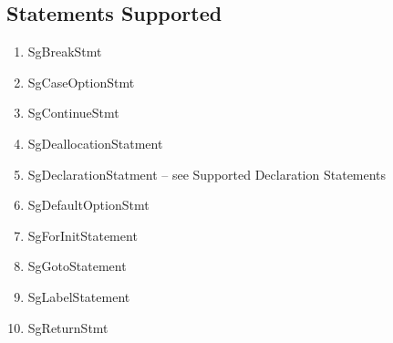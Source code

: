 \documentclass[11pt]{article}
\begin{document}
{\begin{enumeration}
\subsection{Statements Supported}
\begin{enumerate}
\item SgBreakStmt
\item SgCaseOptionStmt
\item SgContinueStmt
\item SgDeallocationStatment
\item SgDeclarationStatment -- see Supported Declaration Statements
\item SgDefaultOptionStmt
\item SgForInitStatement
\item SgGotoStatement
\item SgLabelStatement
\item SgReturnStmt

\end{enumerate}


\end{enumeration}}
\end{document}
